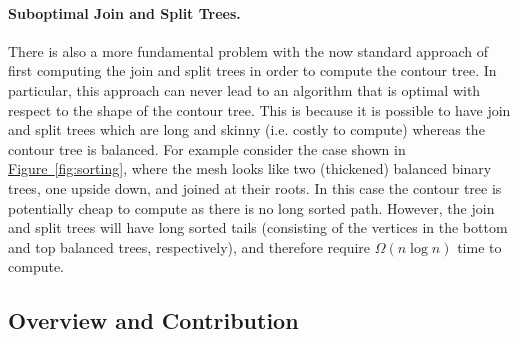\documentclass[11pt]{article}
\theoremstyle{definition}
\newcommand{\Fig}[1]{\hyperref[fig:#1]{Figure~\ref*{fig:#1}}} %
\begin{document}

\paragraph{Suboptimal Join and Split Trees.}
There is also a more fundamental problem with the now standard approach of first computing 
the join and split trees in order to compute the contour tree.  In particular, this approach 
can never lead to an algorithm that is optimal with respect to the shape of the contour tree.  
This is because it is possible to have join and split trees which are long and skinny (i.e. 
costly to compute) whereas the contour tree is balanced.  For example consider the case shown 
in \Fig{sorting}, where the mesh looks like two (thickened) balanced binary trees, one upside 
down, and joined at their roots.  In this case the contour tree is potentially cheap to 
compute as there is no long sorted path.  However, the join and split trees will have long 
sorted tails (consisting of the vertices in the bottom and top balanced trees, respectively), 
and therefore require $\Omega(n\log n)$ time to compute.

\subsection{Overview and Contribution}
\end{document}
